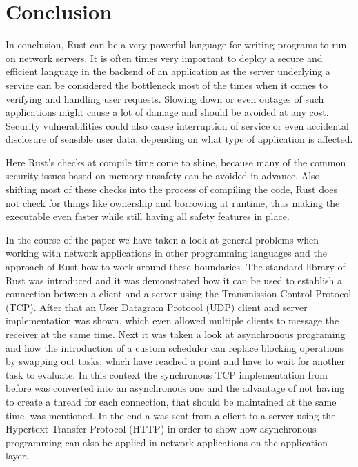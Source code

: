 
\section{Conclusion}
In conclusion, Rust can be a very powerful language for writing programs to run on network servers. It is often times
very important to deploy a secure and efficient language in the backend of an application as the server underlying a
service can be considered the bottleneck most of the times when it comes to verifying and handling user requests.
Slowing down or even outages of such applications might cause a lot of damage and should be avoided at any cost.
Security vulnerabilities could also cause interruption of service or even accidental disclosure of sensible user data,
depending on what type of application is affected.

Here Rust's checks at compile time come to shine, because many of the common security issues based on memory unsafety
can be avoided in advance. Also shifting most of these checks into the process of compiling the code, Rust does not
check for things like ownership and borrowing at runtime, thus making the executable even faster while still having
all safety features in place.

In the course of the paper we have taken a look at general problems when working with network applications in other
programming languages and the approach of Rust how to work around these boundaries. The standard library of Rust was
introduced and it was demonstrated how it can be used to establish a connection between a client and a server using the
Transmission Control Protocol (TCP). After that an User Datagram Protocol (UDP) client and server implementation was
shown, which even allowed multiple clients to message the receiver at the same time. Next it was taken a look at
asynchronous programing and how the introduction of a custom scheduler can replace blocking operations by swapping
out tasks, which have reached a  point and have to wait for another task to evaluate. In this context the
synchronous TCP implementation from before was converted into an asynchronous one and the advantage of not having to
create a thread for each connection, that should be maintained at the same time, was mentioned. In the end a
 was sent from a client to a server using the Hypertext Transfer Protocol (HTTP) in order to show how
asynchronous programming can also be applied in network applications on the application layer.

